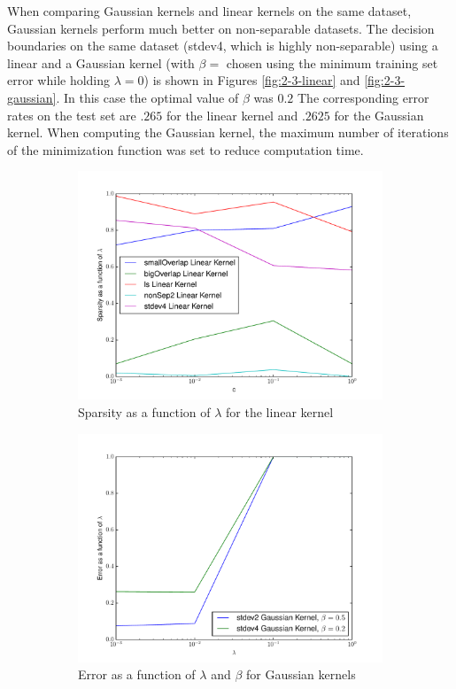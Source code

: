 \documentclass[10pt]{article}
\begin{document}
When comparing Gaussian kernels and linear kernels on the same dataset, Gaussian kernels perform much better on non-separable datasets. The decision boundaries on the same dataset (stdev4, which is highly non-separable) using a linear and a Gaussian kernel (with $\beta = $ chosen using the minimum training set error while holding $\lambda = 0$) is shown in Figures \ref{fig:2-3-linear} and \ref{fig:2-3-gaussian}. In this case the optimal value of $\beta$ was $0.2$ The corresponding error rates on the test set are $.265$ for the linear kernel and $.2625$ for the Gaussian kernel. When computing the Gaussian kernel, the maximum number of iterations of the minimization function was set to reduce computation time.

\begin{figure}[!ht]
\begin{subfigure}[t]{0.46\textwidth}
	\centering
	\includegraphics[width=\textwidth]{exercise2-2.pdf}
	\caption{Sparsity as a function of $\lambda$ for the linear kernel}
	\label{fig:2-2}
\end{subfigure}
\begin{subfigure}[t]{0.46\textwidth}
	\centering
	\includegraphics[width=\textwidth]{exercise2-4.pdf}
	\caption{Error as a function of $\lambda$ and $\beta$ for Gaussian kernels}
	\label{fig:2-4}
\end{subfigure}
\caption{}
\label{fig:2-2-2-4-all}
\end{figure}
\end{document}
